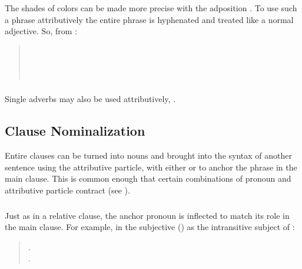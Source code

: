 \subsubsection{} The shades of colors can be made more precise with
the adposition  .  To use such a phrase attributively
the entire phrase is hyphenated and treated like a normal adjective.
So, from  :
\begin{quotation}
\indent{}\\
\indent{}\\
\indent{}\\
\indent{}
\end{quotation}
\label{syn:attr:na}

\subsubsection{} Single adverbs may also be used attributively,
 .


\subsection{Clause Nominalization} Entire clauses can be turned into
nouns and brought into the syntax of another sentence using the
attributive particle, with either  or  to anchor the
phrase in the main clause.  This is common enough that certain
combinations of pronoun and attributive particle contract (see
). \label{syn:clause-nom}

\subsubsection{} Just as in a relative clause, the anchor pronoun is
inflected to match its role in the main clause.  For example, in the
subjective () as the intransitive subject of :

\begin{quotation}
\noindent{}.\\
\indent{}.
\end{quotation}

